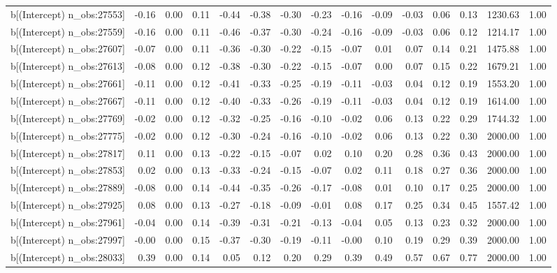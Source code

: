 \begin{table}[ht]
\begin{tabular}{rrrrrrrrrrrrrrr}
  b[(Intercept) n\_obs:27553] & -0.16 & 0.00 & 0.11 & -0.44 & -0.38 & -0.30 & -0.23 & -0.16 & -0.09 & -0.03 & 0.06 & 0.13 & 1230.63 & 1.00 \\ 
  b[(Intercept) n\_obs:27559] & -0.16 & 0.00 & 0.11 & -0.46 & -0.37 & -0.30 & -0.24 & -0.16 & -0.09 & -0.03 & 0.06 & 0.12 & 1214.17 & 1.00 \\ 
  b[(Intercept) n\_obs:27607] & -0.07 & 0.00 & 0.11 & -0.36 & -0.30 & -0.22 & -0.15 & -0.07 & 0.01 & 0.07 & 0.14 & 0.21 & 1475.88 & 1.00 \\ 
  b[(Intercept) n\_obs:27613] & -0.08 & 0.00 & 0.12 & -0.38 & -0.30 & -0.22 & -0.15 & -0.07 & 0.00 & 0.07 & 0.15 & 0.22 & 1679.21 & 1.00 \\ 
  b[(Intercept) n\_obs:27661] & -0.11 & 0.00 & 0.12 & -0.41 & -0.33 & -0.25 & -0.19 & -0.11 & -0.03 & 0.04 & 0.12 & 0.19 & 1553.20 & 1.00 \\ 
  b[(Intercept) n\_obs:27667] & -0.11 & 0.00 & 0.12 & -0.40 & -0.33 & -0.26 & -0.19 & -0.11 & -0.03 & 0.04 & 0.12 & 0.19 & 1614.00 & 1.00 \\ 
  b[(Intercept) n\_obs:27769] & -0.02 & 0.00 & 0.12 & -0.32 & -0.25 & -0.16 & -0.10 & -0.02 & 0.06 & 0.13 & 0.22 & 0.29 & 1744.32 & 1.00 \\ 
  b[(Intercept) n\_obs:27775] & -0.02 & 0.00 & 0.12 & -0.30 & -0.24 & -0.16 & -0.10 & -0.02 & 0.06 & 0.13 & 0.22 & 0.30 & 2000.00 & 1.00 \\ 
  b[(Intercept) n\_obs:27817] & 0.11 & 0.00 & 0.13 & -0.22 & -0.15 & -0.07 & 0.02 & 0.10 & 0.20 & 0.28 & 0.36 & 0.43 & 2000.00 & 1.00 \\ 
  b[(Intercept) n\_obs:27853] & 0.02 & 0.00 & 0.13 & -0.33 & -0.24 & -0.15 & -0.07 & 0.02 & 0.11 & 0.18 & 0.27 & 0.36 & 2000.00 & 1.00 \\ 
  b[(Intercept) n\_obs:27889] & -0.08 & 0.00 & 0.14 & -0.44 & -0.35 & -0.26 & -0.17 & -0.08 & 0.01 & 0.10 & 0.17 & 0.25 & 2000.00 & 1.00 \\ 
  b[(Intercept) n\_obs:27925] & 0.08 & 0.00 & 0.13 & -0.27 & -0.18 & -0.09 & -0.01 & 0.08 & 0.17 & 0.25 & 0.34 & 0.45 & 1557.42 & 1.00 \\ 
  b[(Intercept) n\_obs:27961] & -0.04 & 0.00 & 0.14 & -0.39 & -0.31 & -0.21 & -0.13 & -0.04 & 0.05 & 0.13 & 0.23 & 0.32 & 2000.00 & 1.00 \\ 
  b[(Intercept) n\_obs:27997] & -0.00 & 0.00 & 0.15 & -0.37 & -0.30 & -0.19 & -0.11 & -0.00 & 0.10 & 0.19 & 0.29 & 0.39 & 2000.00 & 1.00 \\ 
  b[(Intercept) n\_obs:28033] & 0.39 & 0.00 & 0.14 & 0.05 & 0.12 & 0.20 & 0.29 & 0.39 & 0.49 & 0.57 & 0.67 & 0.77 & 2000.00 & 1.00 \\ 

\end{tabular}
\end{table}
